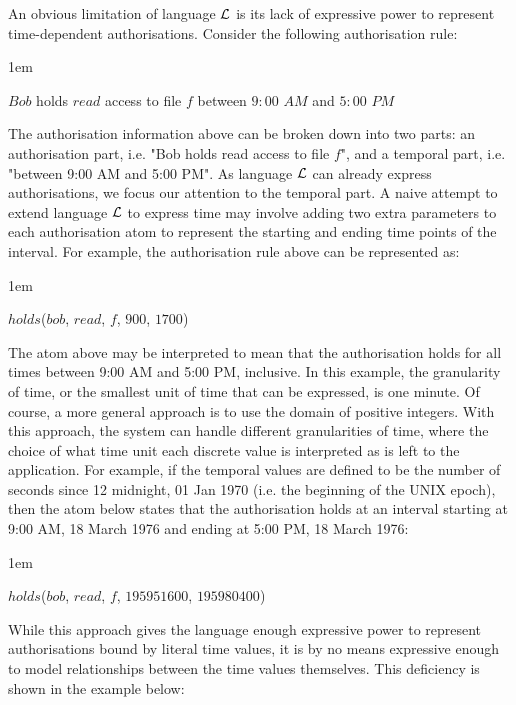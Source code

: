 \documentclass[11pt]{report}
\newenvironment{vquote}
{
  \begin{list}{}{\leftmargin 1em}\item[]
}
{
  \end{list}
}
\begin{document}
      An obvious limitation of language ${\cal L}$ is its lack of expressive
      power to represent time-dependent authorisations. Consider the following
      authorisation rule:

      \begin{vquote}
        $Bob$ holds $read$ access to file $f$ between $9:00$ $AM$ and $5:00$
        $PM$
      \end{vquote}

      The authorisation information above can be broken down into two parts: an
      authorisation part, i.e. "Bob holds read access to file $f$", and a
      temporal part, i.e. "between 9:00 AM and 5:00 PM". As language ${\cal L}$
      can already express authorisations, we focus our attention to the
      temporal part. A naive attempt to extend language ${\cal L}$ to express
      time may involve adding two extra parameters to each authorisation atom
      to represent the starting and ending time points of the interval. For
      example, the authorisation rule above can be represented as:

      \begin{vquote}
        $holds$($bob$, $read$, $f$, $900$, $1700$)
      \end{vquote}

      The atom above may be interpreted to mean that the authorisation holds
      for all times between 9:00 AM and 5:00 PM, inclusive. In this example,
      the granularity of time, or the smallest unit of time that can be
      expressed, is one minute. Of course, a more general approach is to use
      the domain of positive integers. With this approach, the system can
      handle different granularities of time, where the choice of what time
      unit each discrete value is interpreted as is left to the application.
      For example, if the temporal values are defined to be the number of
      seconds since 12 midnight, 01 Jan 1970 (i.e. the beginning of the UNIX
      epoch), then the atom below states that the authorisation holds at an
      interval starting at 9:00 AM, 18 March 1976 and ending at 5:00 PM, 18
      March 1976:

      \begin{vquote}
        $holds$($bob$, $read$, $f$, $195951600$, $195980400$)
      \end{vquote}

      While this approach gives the language enough expressive power to
      represent authorisations bound by literal time values, it is by no means
      expressive enough to model relationships between the time values
      themselves. This deficiency is shown in the example below:
\end{document}
